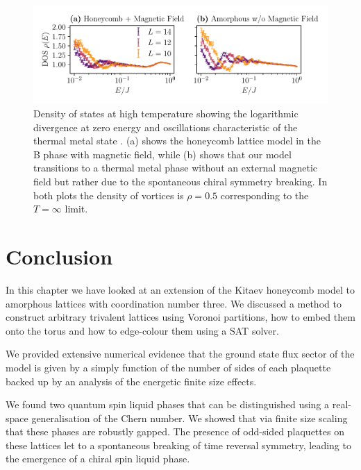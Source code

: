 \hypertarget{fig:DOS_oscillations}{%
\begin{figure}
\centering
\includegraphics[width=1\textwidth,height=\textheight]{figure_code/amk_chapter/results/DOS_oscillations/DOS_oscillations}
\caption[{Distinctive Oscillations in the Density of States}]{Density of states at high temperature showing the logarithmic divergence at zero energy and oscillations characteristic of the thermal metal state \autocite{bocquet_disordered_2000,selfThermallyInducedMetallic2019}. (a) shows the honeycomb lattice model in the B phase with magnetic field, while (b) shows that our model transitions to a thermal metal phase without an external magnetic field but rather due to the spontaneous chiral symmetry breaking. In both plots the density of vortices is \(\rho = 0.5\) corresponding to the \(T = \infty\) limit.}
\label{fig:DOS_oscillations}
\end{figure}
}

\hypertarget{conclusion}{%
\section{Conclusion}\label{conclusion}}

In this chapter we have looked at an extension of the Kitaev honeycomb model to amorphous lattices with coordination number three. We discussed a method to construct arbitrary trivalent lattices using Voronoi partitions, how to embed them onto the torus and how to edge-colour them using a SAT solver.

We provided extensive numerical evidence that the ground state flux sector of the model is given by a simply function of the number of sides of each plaquette backed up by an analysis of the energetic finite size effects.

We found two quantum spin liquid phases that can be distinguished using a real-space generalisation of the Chern number. We showed that via finite size scaling that these phases are robustly gapped. The presence of odd-sided plaquettes on these lattices let to a spontaneous breaking of time reversal symmetry, leading to the emergence of a chiral spin liquid phase.


